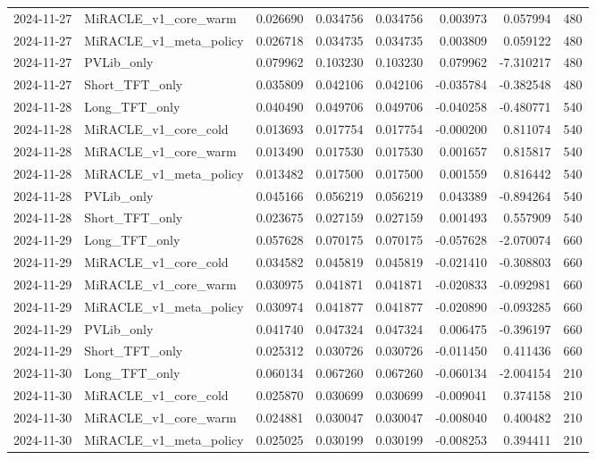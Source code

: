 \begin{tabular}{llrrrrrr}
2024-11-27 & MiRACLE_v1_core_warm & 0.026690 & 0.034756 & 0.034756 & 0.003973 & 0.057994 & 480 \\
2024-11-27 & MiRACLE_v1_meta_policy & 0.026718 & 0.034735 & 0.034735 & 0.003809 & 0.059122 & 480 \\
2024-11-27 & PVLib_only & 0.079962 & 0.103230 & 0.103230 & 0.079962 & -7.310217 & 480 \\
2024-11-27 & Short_TFT_only & 0.035809 & 0.042106 & 0.042106 & -0.035784 & -0.382548 & 480 \\
2024-11-28 & Long_TFT_only & 0.040490 & 0.049706 & 0.049706 & -0.040258 & -0.480771 & 540 \\
2024-11-28 & MiRACLE_v1_core_cold & 0.013693 & 0.017754 & 0.017754 & -0.000200 & 0.811074 & 540 \\
2024-11-28 & MiRACLE_v1_core_warm & 0.013490 & 0.017530 & 0.017530 & 0.001657 & 0.815817 & 540 \\
2024-11-28 & MiRACLE_v1_meta_policy & 0.013482 & 0.017500 & 0.017500 & 0.001559 & 0.816442 & 540 \\
2024-11-28 & PVLib_only & 0.045166 & 0.056219 & 0.056219 & 0.043389 & -0.894264 & 540 \\
2024-11-28 & Short_TFT_only & 0.023675 & 0.027159 & 0.027159 & 0.001493 & 0.557909 & 540 \\
2024-11-29 & Long_TFT_only & 0.057628 & 0.070175 & 0.070175 & -0.057628 & -2.070074 & 660 \\
2024-11-29 & MiRACLE_v1_core_cold & 0.034582 & 0.045819 & 0.045819 & -0.021410 & -0.308803 & 660 \\
2024-11-29 & MiRACLE_v1_core_warm & 0.030975 & 0.041871 & 0.041871 & -0.020833 & -0.092981 & 660 \\
2024-11-29 & MiRACLE_v1_meta_policy & 0.030974 & 0.041877 & 0.041877 & -0.020890 & -0.093285 & 660 \\
2024-11-29 & PVLib_only & 0.041740 & 0.047324 & 0.047324 & 0.006475 & -0.396197 & 660 \\
2024-11-29 & Short_TFT_only & 0.025312 & 0.030726 & 0.030726 & -0.011450 & 0.411436 & 660 \\
2024-11-30 & Long_TFT_only & 0.060134 & 0.067260 & 0.067260 & -0.060134 & -2.004154 & 210 \\
2024-11-30 & MiRACLE_v1_core_cold & 0.025870 & 0.030699 & 0.030699 & -0.009041 & 0.374158 & 210 \\
2024-11-30 & MiRACLE_v1_core_warm & 0.024881 & 0.030047 & 0.030047 & -0.008040 & 0.400482 & 210 \\
2024-11-30 & MiRACLE_v1_meta_policy & 0.025025 & 0.030199 & 0.030199 & -0.008253 & 0.394411 & 210 \\

\end{tabular}
